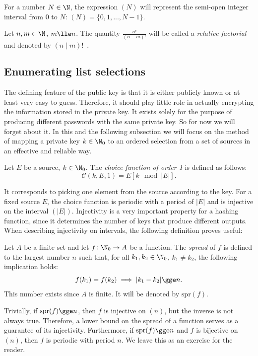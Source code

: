 \documentclass[12pt, a4paper]{article}
\renewcommand{\C}{\mathcal{C}}
\newcommand{\spr}[1]{\mathrm{spr}(#1)}
\begin{document}
For a number $ N \in \N $, the expression $ (N) $ will represent the semi-open integer interval from 0 to $ N $: $ (N) = \{0, 1, ..., N-1\} $.

Let $ n, m \in \N $, $ m \lle n $. The quantity $ \frac{n!}{(n-m)!} $ will be called a \emph{relative factorial} and denoted by $ (n \mid m)! $\ .

\subsection{Enumerating list selections}

The defining feature of the public key is that it is either publicly known or at least very easy to guess. Therefore, it should play little role in actually encrypting the information stored in the private key. It exists solely for the purpose of producing different passwords with the same private key. So for now we will forget about it. In this and the following subsection we will focus on the method of mapping a private key $ k \in \N_0 $ to an ordered selection from a set of sources in an effective and reliable way.

\begin{definition}
    Let $ E $ be a source, $ k \in \N_0 $. The \emph{choice function of order 1} is defined as follows:
    \[ \C(k, E, 1) = E[k\mod |E|]. \] 
\end{definition}

It corresponds to picking one element from the source according to the key. For a fixed source $ E $, the choice function is periodic with a period of $ |E| $ and is injective  on the interval $ (|E|) $. Injectivity is a very important property for a hashing function, since it determines the number of keys that produce different outputs. When describing injectivity on intervals, the following definition proves useful:

\begin{definition}
    Let $ A $ be a finite set and let $ f \colon \N_0 \to A $ be a function. The \emph{spread} of $ f $ is defined to the largest number $ n $ such that, for all $ k_1, k_2 \in \N_0 $, $ k_1 \ne k_2 $, the following implication holds:
    \[ f(k_1) = f(k_2) \implies |k_1 - k_2| \gge n. \]
    This number exists since $ A $ is finite. It will be denoted by $ \spr{f} $.
\end{definition}

Trivially, if $ \spr{f} \gge n $, then $ f $ is injective on $ (n) $, but the inverse is not always true. Therefore, a lower bound on the spread of a function serves as a guarantee of its injectivity. Furthermore, if $ \spr{f} \gge n $ and $ f $ is bijective on $ (n) $, then $ f $ is periodic with period $ n $. We leave this as an exercise for the reader.
\end{document}
